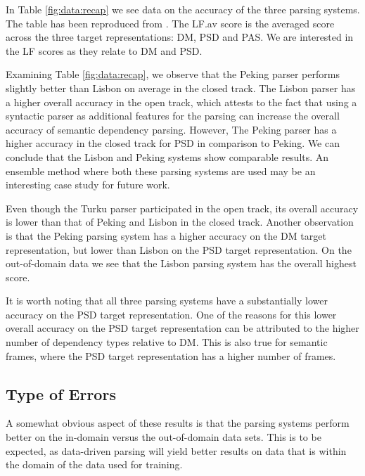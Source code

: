 In Table \ref{fig:data:recap} we see data on the accuracy of the three parsing systems. The table has been reproduced from . The LF.av score is the averaged score across the three target representations: DM, PSD and PAS. We are interested in the LF scores as they relate to DM and PSD.

Examining Table \ref{fig:data:recap}, we observe that the Peking parser performs slightly better than Lisbon on average in the closed track. The Lisbon parser has a higher overall accuracy in the open track, which attests to the fact that using a syntactic parser as additional features for the parsing can increase the overall accuracy of semantic dependency parsing. However, The Peking parser has a higher accuracy in the closed track for PSD in comparison to Peking. We can conclude that the Lisbon and Peking systems show comparable results. An ensemble method where both these parsing systems are used may be an interesting case study for future work.

Even though the Turku parser participated in the open track, its overall accuracy is lower than that of Peking and Lisbon in the closed track. Another observation is that the Peking parsing system has a higher accuracy on the DM target representation, but lower than Lisbon on the PSD target representation. On the out-of-domain data we see that the Lisbon parsing system has the overall highest score. 


It is worth noting that all three parsing systems have a substantially lower accuracy on the PSD target representation. One of the reasons for this lower overall accuracy on the PSD target representation can be attributed to the higher number of dependency types relative to DM. This is also true for semantic frames, where the PSD target representation has a higher number of frames.

\subsection{Type of Errors}

A somewhat obvious aspect of these results is that the parsing systems perform better on the in-domain versus the out-of-domain data sets. This is to be expected, as data-driven parsing will yield better results on data that is within the domain of the data used for training. 

